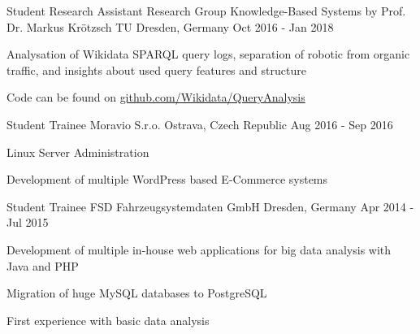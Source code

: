 \begin{cventries}
	\cventry
	{Student Research Assistant} %
	{Research Group Knowledge-Based Systems by Prof. Dr. Markus Krötzsch} %
	{TU Dresden, Germany} %
	{Oct 2016 - Jan 2018} %
	{
		\begin{cvitems} %
			\item {Analysation of Wikidata SPARQL query logs, separation of robotic from organic traffic, and insights about used query features and structure}
			\item{Code can be found on \href{https://github.com/Wikidata/QueryAnalysis}{github.com/Wikidata/QueryAnalysis}}
		\end{cvitems}
	}

	\cventry
	{Student Trainee} %
	{Moravio S.r.o.} %
	{Ostrava, Czech Republic} %
	{Aug 2016 - Sep 2016} %
	{
		\begin{cvitems} %
			\item {Linux Server Administration}
			\item {Development of multiple WordPress based E-Commerce systems}
		\end{cvitems}
	}

	\cventry
	{Student Trainee} %
	{FSD Fahrzeugsystemdaten GmbH} %
	{Dresden, Germany} %
	{Apr 2014 - Jul 2015} %
	{
		\begin{cvitems} %
			\item {Development of multiple in-house web applications for big data analysis with Java and PHP}
			\item{Migration of huge MySQL databases to PostgreSQL}
			\item{First experience with basic data analysis}
		\end{cvitems}
	}


\end{cventries}

